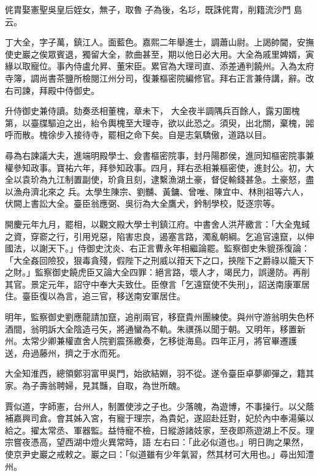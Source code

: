\begin{pinyinscope}
 侂胄娶憲聖吳皇后姪女，無子，取魯𡬐子為後，名㣉，既誅侂胄，削籍流沙門
 島云。



 丁大全，字子萬，鎮江人。面藍色。嘉熙二年舉進士，調蕭山尉。上謁帥閫，安撫使史巖之俟眾賓退，獨留大全，款曲甚至，期以他日必大用。大全為戚里婢婿，寅緣以取寵位。事內侍盧允昇、董宋臣。累官為大理司直、添差通判饒州。入為太府寺簿，調尚書茶鹽所檢閱江州分司，復兼樞密院編修官。拜右正言兼侍講，辭。改右司諫，拜殿中侍御史。



 升侍御史兼侍讀。劾奏丞相董槐，章未下，
 大全夜半調隅兵百餘人，露刃圍槐第，以臺牒驅迫之出，紿令輿槐至大理寺，欲以此恐之。須臾，出北關，棄槐，嘂呼而散。槐徐步入接待寺，罷相之命下矣。自是志氣驕傲，道路以目。



 尋為右諫議大夫，進端明殿學士、僉書樞密院事，封丹陽郡侯，進同知樞密院事兼權參知政事。寶祐六年，拜參知政事。四月，拜右丞相兼樞密使，進封公。初，大全以袁玠為九江制置副使，玠貪且刻，逮繫漁湖土豪，督促輸錢甚急。土豪怒，盡以漁舟濟北來之
 兵。太學生陳宗、劉黼、黃鏞、曾唯、陳宜中、林則祖等六人，伏闕上書訟大全。臺臣翁應弼、吳衍為大全鷹犬，鈐制學校，貶逐宗等。



 開慶元年九月，罷相，以觀文殿大學士判鎮江府。中書舍人洪芹繳言：「大全鬼蜮之資，穿窬之行，引用兇惡，陷害忠良，遏塞言路，濁亂朝綱。乞追官遠竄，以伸國法，以謝天下。」侍御史沈炎、右正言曹永年相繼論罷。監察御史朱貔孫復論：「大全姦回險狡，狠毒貪殘，假陛下之刑威以箝天下之口，挾陛下之爵祿以籠天下
 之財。」監察御史饒虎臣又論大全四罪：絕言路，壞人才，竭民力，誤邊防。再削其官。景定元年，詔守中奉大夫致仕。臣僚言「乞遠竄使不失刑」，詔送南康軍居住。臺臣復以為言，追三官，移送南安軍居住。



 明年，監察御史劉應龍請加竄，追削兩官，移竄貴州團練使。與州守游翁明失色杯酒間，翁明訴大全陰造弓矢，將通蠻為不軌。朱禩孫以聞于朝。又明年，移置新州。太常少卿兼權直舍人院劉震孫繳奏，乞移徙海島。四年正月，將官畢遷護
 送，舟過藤州，擠之于水而死。



 大全知淮西，總領鄭羽富甲吳門，始欲結婣，羽不從。遂令臺臣卓夢卿彈之，籍其家。為子壽翁聘婦，見其豔，自取，為世所醜。



 賈似道，字師憲，台州人，制置使涉之子也。少落魄，為遊博，不事操行。以父蔭補嘉興司倉。會其姊入宮，有寵于理宗，為貴妃，遂詔赴廷對，妃於內中奉湯藥以給之。擢太常丞、軍器監。益恃寵不檢，日縱游諸妓家，至夜即燕遊湖上不反。理宗嘗夜憑高，望西湖中燈火異常時，語
 左右曰：「此必似道也。」明日詢之果然，使京尹史巖之戒敕之。巖之曰：「似道雖有少年氣習，然其材可大用也。」尋出知澧州。




\end{pinyinscope}
